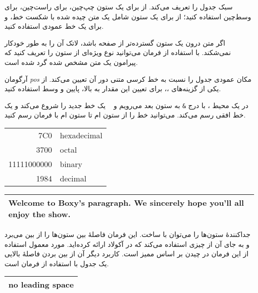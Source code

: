 \noindent 
سبک‌ جدول را تعریف می‌کند. از 
برای یک ستون چپ‌چین، 
برای راست‌چین، 
برای وسط‌چین استفاده کنید؛ از 
برای یک ستون شامل یک متن چیده شده با شکست خط، و 
برای یک خط عمودی استفاده کنید.

اگر متن درون یک ستون گسترده‌‌تر از صفحه باشد، لاتک آن را به طور خودکار نمی‌شکند. با استفاده از فرمان 
می‌توانید نوع ویژه‌ای از ستون را تعریف کنید که پیرامون یک متن مشخص شده گرد شده است.

آرگومان 
\emph{pos}
مکان عمودی جدول را نسبت به خط کرسی متنی دور آن تعیین می‌کند. از یکی از گزینه‌های 
،،
برای تعیین این مقدار به بالا، پایین و وسط استفاده کنید.

در یک محیط 
،
با درج 
\texttt{\&}
به ستون بعد می‌رویم و 
\
 \ci{\bs}
یک خط جدید را شروع می‌کند و 
یک خط افقی رسم می‌کند. می‌توانید خط را از ستون 
ام
تا ستون 
ام
با فرمان 
رسم کنید.

\begin{example}
\begin{tabular}{|r|l|}
\hline
7C0 & hexadecimal \\
3700 & octal \\ \cline{2-2}
11111000000 & binary \\
\hline \hline
1984 & decimal \\
\hline
\end{tabular}
\end{example}

\begin{example}
\begin{tabular}{|p{4.7cm}|}
\hline
Welcome to Boxy's paragraph.
We sincerely hope you'll 
all enjoy the show.\\
\hline 
\end{tabular}
\end{example}

جداکنندهٔ ستون‌ها را می‌توان با 
ساخت. این فرمان فاصلهٔ بین ستون‌ها را از بین می‌برد و به جای آن از چیزی استفاده می‌کند که در آکولاد ارائه کرده‌اید. مورد معمول استفاده از این فرمان در چیدن بر اساس ممیز است. کاربرد دیگر آن از بین بردن فاصلهٔ بالایی یک جدول با استفاده از فرمان 
\mfr{@\{\}}
است.

\begin{example}
\begin{tabular}{@{} l @{}}
\hline 
no leading space\\
\hline
\end{tabular}
\end{example}

